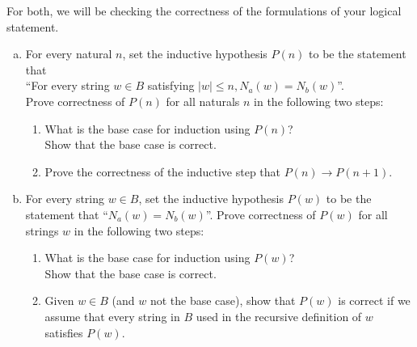 \documentclass[12pt]{article}
\begin{document}
	\noindent
	For both, we will be checking the correctness of the formulations of your logical
	statement.

	\begin{enumerate}[(a)]
		\item For every natural $n$, set the inductive hypothesis $P(n)$ to be the
			statement that\\
			``For every string $w \in B$ satisfying $|w| \leq n, N_{a}(w) = N_{b}(w)$''.\\
			Prove correctness of $P(n)$ for all naturals $n$ in the following two steps:

			\begin{enumerate}
				\item[(ii)] What is the base case for induction using $P(n)$? \\
					Show that the base case is correct.

				\item[(iii)] Prove the correctness of the inductive step that $P(n) \rightarrow
					P(n + 1).$
			\end{enumerate}

		\item For every string $w \in B$, set the inductive hypothesis $P(w)$ to be
			the statement that ``$N_{a}(w) = N_{b}(w)$''. Prove correctness of $P(w)$ for
			all strings $w$ in the following two steps:

			\begin{enumerate}
				\item[(ii)] What is the base case for induction using $P(w)$?\\
					Show that the base case is correct.

				\item[(iii)] Given $w \in B$ (and $w$ not the base case), show that
					$P(w)$ is correct if we assume that every string in $B$ used in the
					recursive definition of $w$ satisfies $P(w).$
			\end{enumerate}
	\end{enumerate}
\end{document}
